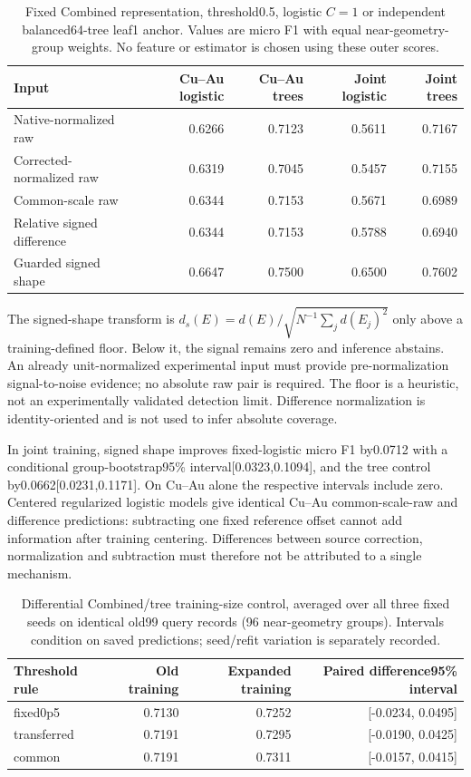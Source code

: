 \begin{table}[!htbp]\centering\scriptsize
\caption{Fixed Combined representation, threshold0.5, logistic $C=1$ or independent balanced64-tree leaf1 anchor. Values are micro F1 with equal near-geometry-group weights. No feature or estimator is chosen using these outer scores.}
\begin{tabular}{lrrrr}\toprule
Input & Cu--Au logistic & Cu--Au trees & Joint logistic & Joint trees\\\midrule
Native-normalized raw & 0.6266 & 0.7123 & 0.5611 & 0.7167\\
Corrected-normalized raw & 0.6319 & 0.7045 & 0.5457 & 0.7155\\
Common-scale raw & 0.6344 & 0.7153 & 0.5671 & 0.6989\\
Relative signed difference & 0.6344 & 0.7153 & 0.5788 & 0.6940\\
Guarded signed shape & 0.6647 & 0.7500 & 0.6500 & 0.7602\\
\bottomrule\end{tabular}\end{table}

The signed-shape transform is $d_s(E)=d(E)/\sqrt{N^{-1}\sum_j d(E_j)^2}$ only above a training-defined floor. Below it, the signal remains zero and inference abstains. An already unit-normalized experimental input must provide pre-normalization signal-to-noise evidence; no absolute raw pair is required. The floor is a heuristic, not an experimentally validated detection limit. Difference normalization is identity-oriented and is not used to infer absolute coverage.

In joint training, signed shape improves fixed-logistic micro F1 by0.0712 with a conditional group-bootstrap95\% interval[0.0323,0.1094], and the tree control by0.0662[0.0231,0.1171]. On Cu--Au alone the respective intervals include zero. Centered regularized logistic models give identical Cu--Au common-scale-raw and difference predictions: subtracting one fixed reference offset cannot add information after training centering. Differences between source correction, normalization and subtraction must therefore not be attributed to a single mechanism.

\begin{table}[!htbp]\centering\scriptsize
\caption{Differential Combined/tree training-size control, averaged over all three fixed seeds on identical old99 query records (96 near-geometry groups). Intervals condition on saved predictions; seed/refit variation is separately recorded.}
\begin{tabular}{lrrr}\toprule
Threshold rule & Old training & Expanded training & Paired difference95\% interval\\\midrule
fixed0p5 & 0.7130 & 0.7252 & [-0.0234, 0.0495]\\
transferred & 0.7191 & 0.7295 & [-0.0190, 0.0425]\\
common & 0.7191 & 0.7311 & [-0.0157, 0.0415]\\
\bottomrule\end{tabular}\end{table}

